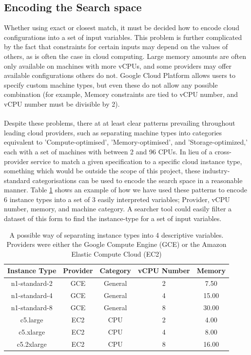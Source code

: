 \documentclass{report}
\begin{document}
\subsection{Encoding the Search space}
Whether using exact or closest match, it must be decided how to encode cloud configurations into a set of input variables. This problem is further complicated by the fact that constraints for certain inputs may depend on the values of others, as is often the case in cloud computing. Large memory amounts are often only available on machines with more vCPUs, and some providers may offer available configurations others do not. Google Cloud Platform allows users to specify custom machine types, but even these do not allow any possible combination (for example, Memory constraints are tied to vCPU number, and vCPU number must be divisible by 2).

\paragraph{}
Despite these problems, there at at least clear patterns prevailing throughout leading cloud providers, such as separating machine types into categories equivalent to 'Compute-optimised', 'Memory-optimised', and 'Storage-optimized,' each with a set of machines with between 2 and 96 CPUs. In lieu of a cross-provider service to match a given specification to a specific cloud instance type, something which would be outside the scope of this project, these industry-standard categorisations can be used to encode the search space in a reasonable manner. Table \ref{tab:config-encode} shows an example of how we have used these patterns to encode 6 instance types into a set of 3 easily interpreted variables; Provider, vCPU number, memory, and machine category. A searcher tool could easily filter a dataset of this form to find the instance-type for a set of input variables.

\begin{table}[!t]
\centering
\begin{tabular}{ |c||c|c|c|c|  }
 \hline
 Instance Type & Provider & Category & vCPU Number & Memory \\
 \hline
 n1-standard-2    & GCE  & General & 2 & 7.50 \\
 n1-standard-4    & GCE  & General & 4 & 15.00 \\
 n1-standard-8    & GCE  & General & 8 & 30.00 \\
 c5.large         & EC2  & CPU & 2 & 4.00 \\
 c5.xlarge    & EC2  & CPU & 4 & 8.00 \\
 c5.2xlarge    & EC2  & CPU & 8 & 16.00 \\
 \hline
\end{tabular}
\caption{A possible way of separating instance types into 4 descriptive variables. Providers were either the Google Compute Engine (GCE) or the Amazon Elastic Compute Cloud (EC2)}
\label{tab:config-encode}
\end{table}
\end{document}
